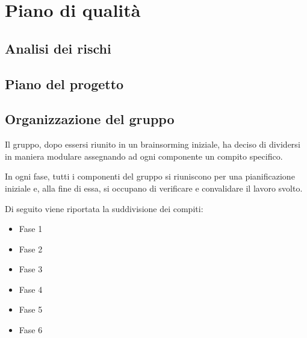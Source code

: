 
\chapter{Piano di qualità}\label{chap:piano-qualita}

\section{Analisi dei rischi}\label{sec:analisi-rischi}

\section{Piano del progetto}\label{sec:piano-progetto}

\section{Organizzazione del gruppo}\label{sec:organizzazione-gruppo}
Il gruppo, dopo essersi riunito in un brainsorming iniziale, ha deciso di 
dividersi in maniera modulare assegnando ad ogni componente un compito 
specifico.

In ogni fase, tutti i componenti del gruppo si riuniscono per una 
pianificazione iniziale e, alla fine di essa, si occupano  di verificare e 
convalidare il lavoro svolto.

Di seguito viene riportata la suddivisione dei compiti:

\begin{itemize}
	\item Fase 1
	\item Fase 2
	\item Fase 3
	\item Fase 4
	\item Fase 5
	\item Fase 6
\end{itemize}

